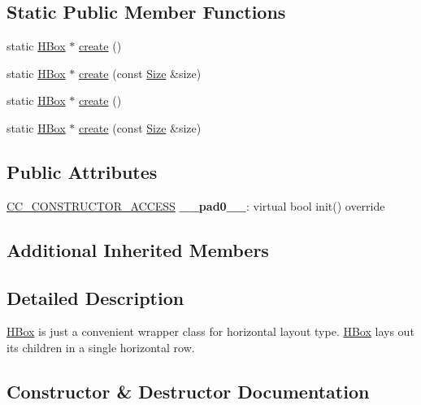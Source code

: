 \subsection*{Static Public Member Functions}
\begin{DoxyCompactItemize}
\item 
static \hyperlink{classui_1_1HBox}{H\+Box} $\ast$ \hyperlink{classui_1_1HBox_ac58f3438c4fd27ce7fe76079231473bf}{create} ()
\item 
static \hyperlink{classui_1_1HBox}{H\+Box} $\ast$ \hyperlink{classui_1_1HBox_a044268defeca5792a7a9a37d751ea2a7}{create} (const \hyperlink{classSize}{Size} \&size)
\item 
static \hyperlink{classui_1_1HBox}{H\+Box} $\ast$ \hyperlink{classui_1_1HBox_abadedafe56d3fa3a59032c373e6e4204}{create} ()
\item 
static \hyperlink{classui_1_1HBox}{H\+Box} $\ast$ \hyperlink{classui_1_1HBox_a044268defeca5792a7a9a37d751ea2a7}{create} (const \hyperlink{classSize}{Size} \&size)
\end{DoxyCompactItemize}
\subsection*{Public Attributes}
\begin{DoxyCompactItemize}
\item 
\mbox{\label{classui_1_1HBox_ac8b4abf69b380dabdc0c696a1b857935}} 
\hyperlink{_2cocos2d_2cocos_2base_2ccConfig_8h_a25ef1314f97c35a2ed3d029b0ead6da0}{C\+C\+\_\+\+C\+O\+N\+S\+T\+R\+U\+C\+T\+O\+R\+\_\+\+A\+C\+C\+E\+SS} {\bfseries \+\_\+\+\_\+pad0\+\_\+\+\_\+}\+: virtual bool init() override
\end{DoxyCompactItemize}
\subsection*{Additional Inherited Members}


\subsection{Detailed Description}
\hyperlink{classui_1_1HBox}{H\+Box} is just a convenient wrapper class for horizontal layout type. \hyperlink{classui_1_1HBox}{H\+Box} lays out its children in a single horizontal row. 

\subsection{Constructor \& Destructor Documentation}
\mbox{\label{classui_1_1HBox_a019d6f16534667d80294fd30306009c6}} 
